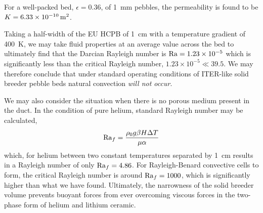 For a well-packed bed, $\epsilon = 0.36$, of \SI{1}{\milli\meter} pebbles, the permeability is found to be $K = \SI{6.33E-10}{\meter\squared}$.

Taking a half-width of the EU HCPB of \SI{1}{\centi\meter} with a temperature gradient of \SI{400}{\kelvin}, we may take fluid properties at an average value across the bed to ultimately find that the Darcian Rayleigh number is $\mathrm{Ra} = \SI{1.23E-5}{}$ which is significantly less than the critical Rayleigh number, $1.23\times 10^{-5} \ll 39.5$. We may therefore conclude that under standard operating conditions of ITER-like solid breeder pebble beds natural convection \textit{will not occur}.

We may also consider the situation when there is no porous medium present in the duct. In the condition of pure helium, standard Rayleigh number may be calculated,
\begin{equation}
\mathrm{Ra}_f = \frac{\rho_0 g \beta H \Delta T}{\mu \alpha}
\end{equation}
which, for helium between two constant temperatures separated by \SI{1}{\centi\meter} results in a Rayleigh number of only $\mathrm{Ra}_f = 4.86$. For Rayleigh-Benard convective cells to form, the critical Rayleigh number is around $\mathrm{Ra}_f = 1000$, which is significantly higher than what we have found. Ultimately, the narrowness of the solid breeder volume prevents buoyant forces from ever overcoming viscous forces in the two-phase form of helium and lithium ceramic.

